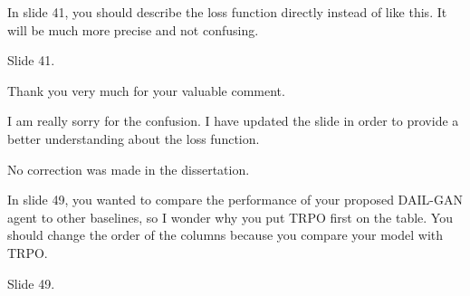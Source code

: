 
\begin{revcomment}
  In slide 41,
  you should describe the loss function directly instead of like this.
  It will be much more precise and not confusing.

  {Slide 41.}
\end{revcomment}

\begin{revresponse}
  Thank you very much for your valuable comment.

  I am really sorry for the confusion.
  I have updated the slide in order to provide a better understanding about the loss function.

  \begin{correction}
    No correction was made in the dissertation.
  \end{correction}
\end{revresponse}


\begin{revcomment}
  In slide 49,
  you wanted to compare the performance of your proposed DAIL-GAN agent to other baselines,
  so I wonder why you put TRPO first on the table.
  You should change the order of the columns because you compare your model with TRPO.

  {Slide 49.}
\end{revcomment}

